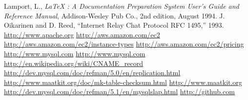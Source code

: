 \documentclass[12pt]{article}
\begin{document}
\begin{thebibliography}{99}
 Lamport, L., {\it LaTeX : A Documentation
 Preparation System User's Guide and Reference Manual}, Addison-Wesley
 Pub Co., 2nd edition, August 1994.
 J. Oikarinen and D. Reed, “Internet Relay Chat Protocol
RFC 1495,” 1993.
 \url{http://www.apache.org}
  \url{http://aws.amazon.com/ec2}
 \url{http://aws.amazon.com/ec2/instance-types}
\url{http://aws.amazon.com/ec2/pricing}
 \url{http://www.mysql.com}
 \url{http://www.mysql.com}
 \url{http://en.wikipedia.org/wiki/CNAME\_record}
 \url{http://dev.mysql.com/doc/refman/5.0/en/replication.html}
 \url{http://www.maatkit.org/doc/mk-table-checksum.html}
 \url{http://www.maatkit.org}
 \url{http://dev.mysql.com/doc/refman/5.1/en/mysqlslap.html}
 \url{http://github.com}
\end{thebibliography}
\end{document}
